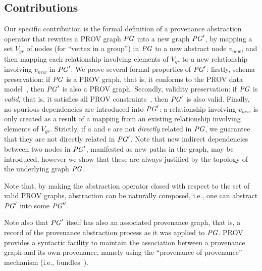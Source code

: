 

 
\subsection{Contributions}
Our specific contribution is the formal definition of a provenance abstraction operator that rewrites  a PROV graph $\mathit{PG}$ into a new graph $\mathit{PG}'$, by mapping a set $V_{gr}$ of nodes (for ``vertex in a group'') in $\mathit{PG}$ to a new abstract node $v_{new}$, and then mapping each relationship involving elements of $V_{gr}$ to a new relationship involving $v_{new}$ in $\mathit{PG}'$. 
We prove several formal properties of $\mathit{PG}'$: firstly, schema preservation: if $\mathit{PG}$ is a PROV graph, that is, it conforms to the PROV data model~\citep{w3c-prov-dm}, then $\mathit{PG}'$ is also a PROV graph. Secondly, validity preservation: if $\mathit{PG}$ is \textit{valid}, that is, it satisfies all PROV constraints~\citep{w3c-prov-dm}, then $\mathit{PG}'$ is also valid. Finally, no spurious dependencies are introduced into $\mathit{PG}'$: a  relationship involving $v_{new}$ is only created as a result of a mapping from an existing relationship involving elements of $V_{gr}$. Strictly, if $a$ and $e$ are not \textit{directly} related in $\mathit{PG}$, we guarantee that they are not directly related in $\mathit{PG}'$. 
Note that new indirect dependencies between two nodes in $\mathit{PG}'$, manifested as new paths in the graph, may be introduced, however we show that these are always justified by the topology of the underlying graph $\mathit{PG}$.

Note that, by making the abstraction operator closed with respect to the set of valid PROV graphs, abstraction can be naturally composed, i.e., one can abstract $\mathit{PG}'$ into some $\mathit{PG}''$.

Note also that $\mathit{PG}'$ itself has also an associated provenance graph, that is, a record of the provenance abstraction process as it was applied to $\mathit{PG}$. 
PROV provides a syntactic facility to maintain the association between a provenance graph and its own provenance, namely using the ``provenance of provenance'' mechanism (i.e., bundles~\citep{w3c-prov-dm}).
